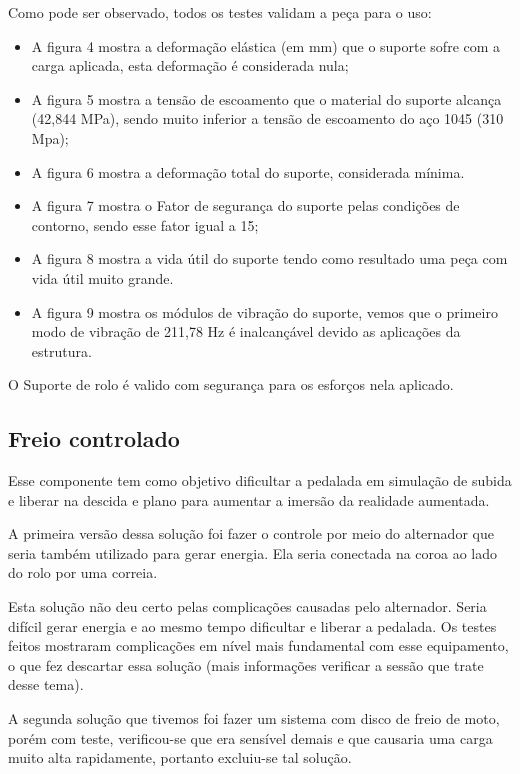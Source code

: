 Como pode ser observado, todos os testes validam a peça para o uso:
\begin{itemize}
    \item A figura 4 mostra a deformação elástica (em mm) que o suporte sofre com a carga aplicada, esta deformação é considerada nula;
    \item A figura 5 mostra a tensão de escoamento que o material do suporte alcança (42,844 MPa), sendo muito inferior a tensão de escoamento do aço 1045 (310 Mpa);
    \item A figura 6 mostra a deformação total do suporte, considerada mínima.
    \item A figura 7 mostra o Fator de segurança do suporte pelas condições de contorno, sendo esse fator igual a 15;
    \item A figura 8 mostra a vida útil do suporte tendo como resultado uma peça com vida útil muito grande.
    \item A figura 9 mostra os módulos de vibração do suporte, vemos que o primeiro modo de vibração de 211,78 Hz é inalcançável devido as aplicações da estrutura.
\end{itemize}

O Suporte de rolo é valido com segurança para os esforços nela aplicado.

\subsection{Freio controlado} 
    Esse componente tem como objetivo dificultar a pedalada em simulação de subida e liberar na descida e plano para aumentar a imersão da realidade aumentada.

    A primeira versão dessa solução foi fazer o controle por meio do alternador que seria também utilizado para gerar energia. Ela seria conectada na coroa ao lado do rolo por uma correia.

    Esta solução não deu certo pelas complicações causadas pelo alternador. Seria difícil gerar energia e ao mesmo tempo dificultar e liberar a pedalada. Os testes feitos mostraram complicações em nível mais fundamental com esse equipamento, o que fez descartar essa solução (mais informações verificar a sessão que trate desse tema).

    A segunda solução que tivemos foi fazer um sistema com disco de freio de moto, porém com teste, verificou-se que era sensível demais e que causaria uma carga muito alta rapidamente, portanto excluiu-se tal solução.

